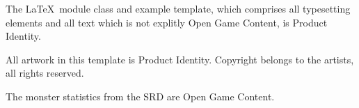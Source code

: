 \documentclass[a4paper]{module}
\begin{document}
\begin{productidentity}
\item The \LaTeX~module class and example template, which comprises all typesetting elements and all text which is not explitly Open Game Content, is Product Identity.
\modulecopyright

\item All artwork in this template is Product Identity. Copyright belongs to the artists, all rights reserved.
\end{productidentity}

\begin{opengamecontent}
\item The monster statistics from the SRD are Open Game Content.
\end{opengamecontent}
\end{document}
